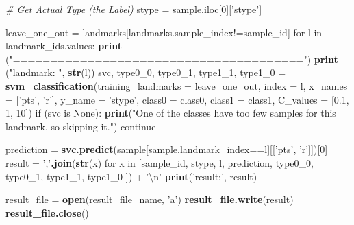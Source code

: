 \documentclass[10pt,letterpaper]{article}
\newenvironment{Shaded}{\begin{snugshade}}{\end{snugshade}}
\newcommand{\KeywordTok}[1]{\textcolor[rgb]{0.13,0.29,0.53}{\textbf{{#1}}}}
\newcommand{\DataTypeTok}[1]{\textcolor[rgb]{0.13,0.29,0.53}{{#1}}}
\newcommand{\DecValTok}[1]{\textcolor[rgb]{0.00,0.00,0.81}{{#1}}}
\newcommand{\FloatTok}[1]{\textcolor[rgb]{0.00,0.00,0.81}{{#1}}}
\newcommand{\CharTok}[1]{\textcolor[rgb]{0.31,0.60,0.02}{{#1}}}
\newcommand{\StringTok}[1]{\textcolor[rgb]{0.31,0.60,0.02}{{#1}}}
\newcommand{\CommentTok}[1]{\textcolor[rgb]{0.56,0.35,0.01}{\textit{{#1}}}}
\newcommand{\NormalTok}[1]{{#1}}
\begin{document}
\begin{Shaded}
\begin{Highlighting}[]
    \CommentTok{# Get Actual Type (the Label)}
    \NormalTok{stype =}\StringTok{ }\NormalTok{sample.iloc[}\DecValTok{0}\NormalTok{][}\StringTok{'stype'}\NormalTok{]}

    \NormalTok{leave_one_out =}\StringTok{ }\NormalTok{landmarks[landmarks.sample_index!=sample_id]}
    \NormalTok{for l in landmark_ids.values:}
\StringTok{        }\KeywordTok{print} \NormalTok{(}\StringTok{"======================================="}\NormalTok{)}
        \KeywordTok{print} \NormalTok{(}\StringTok{"landmark: "}\NormalTok{, }\KeywordTok{str}\NormalTok{(l))}
        \NormalTok{svc, type0_0, type0_1, type1_1, type1_0 =}
\StringTok{            }\KeywordTok{svm_classification}\NormalTok{(}\DataTypeTok{training_landmarks =} \NormalTok{leave_one_out,}
                                                 \DataTypeTok{index =} \NormalTok{l,}
                                                 \DataTypeTok{x_names =} \NormalTok{[}\StringTok{'pts'}\NormalTok{, }\StringTok{'r'}\NormalTok{],}
                                                 \DataTypeTok{y_name =} \StringTok{'stype'}\NormalTok{,}
                                                 \DataTypeTok{class0 =} \NormalTok{class0,}
                                                 \DataTypeTok{class1 =} \NormalTok{class1,}
                                                 \DataTypeTok{C_values =} \NormalTok{[}\FloatTok{0.1}\NormalTok{, }\DecValTok{1}\NormalTok{, }\DecValTok{10}\NormalTok{])}
        \NormalTok{if (svc is None):}
\StringTok{            }\KeywordTok{print}\NormalTok{(}\StringTok{"One of the classes have too few samples}
\StringTok{                for this landmark, so skipping it."}\NormalTok{)}
            \NormalTok{continue}

        \NormalTok{prediction =}
\StringTok{            }\KeywordTok{svc.predict}\NormalTok{(sample[sample.landmark_index==l][[}\StringTok{'pts'}\NormalTok{, }\StringTok{'r'}\NormalTok{]])[}\DecValTok{0}\NormalTok{]}
        \NormalTok{result =}\StringTok{ ','}\KeywordTok{.join}\NormalTok{(}\KeywordTok{str}\NormalTok{(x) for x in [sample_id, stype, l, prediction,}
            \NormalTok{type0_0, type0_1, type1_1, type1_0 ]) +}\StringTok{ '}\CharTok{\textbackslash{}n}\StringTok{'}
        \KeywordTok{print}\NormalTok{(}\StringTok{'result:'}\NormalTok{, result)}

        \NormalTok{result_file =}\StringTok{ }\KeywordTok{open}\NormalTok{(result_file_name, }\StringTok{'a'}\NormalTok{)}
        \KeywordTok{result_file.write}\NormalTok{(result)}
        \KeywordTok{result_file.close}\NormalTok{()}
\end{Highlighting}
\end{Shaded}
\end{document}

